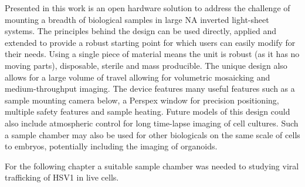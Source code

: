 Presented in this work is an open hardware solution to address the challenge of mounting a breadth of biological samples in large \gls{NA} inverted light-sheet systems.
The principles behind the design can be used directly, applied and extended to provide a robust starting point for which users can easily modify for their needs.
Using a single piece of  material means the unit is robust (as it has no moving parts), disposable, sterile and mass producible.
The unique design also allows for a large volume of travel allowing for volumetric mosaicking and medium-throughput imaging.
The device features many useful features such as a sample mounting camera below, a Perspex window for precision positioning, multiple safety features and sample heating.
Future models of this design could also include atmospheric control for long time-lapse imaging of cell cultures.
Such a sample chamber may also be used for other biologicals on the same scale of cells to embryos, potentially including the imaging of \gls{organoid}s.

For the following chapter a suitable sample chamber was needed to studying viral trafficking of \gls{HSV1} in live cells.
%


